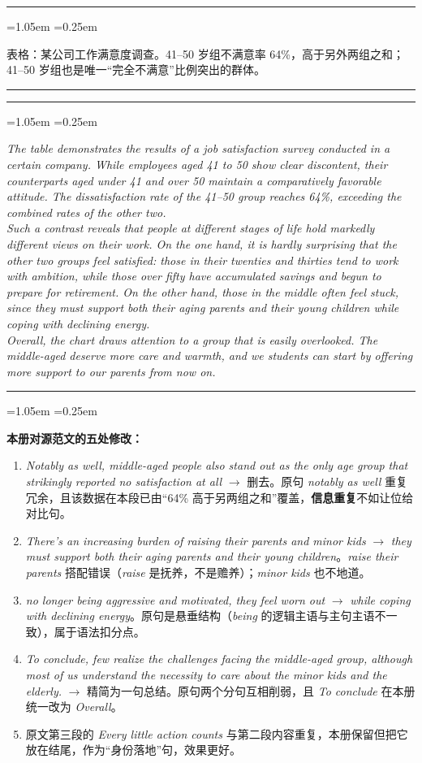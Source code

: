 \documentclass[11pt,a4paper]{ctexart}
\newcommand{\en}[1]{\textit{#1}}
\newenvironment{tpl}[1]{%
  \par\addvspace{7pt}\needspace{4\baselineskip}%
  \noindent{\bfseries\color{accent}#1}\par\nopagebreak
  \vspace{2pt}\noindent\rule{\linewidth}{0.7pt}\par\nopagebreak\vspace{3pt}%
  \begin{list}{}{\leftmargin=1.05em \rightmargin=0.25em \listparindent=0pt
    \itemindent=0pt \topsep=0pt \parsep=2.5pt \itemsep=2.5pt \partopsep=0pt}%
  \item\relax
}{%
  \end{list}\vspace{1pt}\noindent\rule{\linewidth}{0.7pt}\par\addvspace{8pt}%
}
\newenvironment{note}{%
  \par\addvspace{5pt}%
  \begin{list}{}{\leftmargin=1.05em \rightmargin=0.25em \listparindent=0pt
    \itemindent=0pt \topsep=0pt \parsep=2pt \itemsep=2pt \partopsep=0pt}%
  \item\relax\small\color{ink}%
}{%
  \end{list}\addvspace{5pt}%
}
\begin{document}
\begin{tpl}{题目要点}
表格：某公司工作满意度调查。41--50 岁组不满意率 64\%，高于另外两组之和；41--50 岁组也是唯一“完全不满意”比例突出的群体。
\end{tpl}

\begin{tpl}{批注版范文（158 词）}
\en{The table demonstrates the results of a job satisfaction survey conducted in a certain company. While employees aged 41 to 50 show clear discontent, their counterparts aged under 41 and over 50 maintain a comparatively favorable attitude. The dissatisfaction rate of the 41--50 group reaches 64\%, exceeding the combined rates of the other two.}\\[3pt]
\en{Such a contrast reveals that people at different stages of life hold markedly different views on their work. On the one hand, it is hardly surprising that the other two groups feel satisfied: those in their twenties and thirties tend to work with ambition, while those over fifty have accumulated savings and begun to prepare for retirement. On the other hand, those in the middle often feel stuck, since they must support both their aging parents and their young children while coping with declining energy.}\\[3pt]
\en{Overall, the chart draws attention to a group that is easily overlooked. The middle-aged deserve more care and warmth, and we students can start by offering more support to our parents from now on.}
\end{tpl}

\begin{note}
\textbf{本册对源范文的五处修改：}
\begin{enumerate}[leftmargin=1.7em,itemsep=1.5pt,topsep=2pt]
\item \en{Notably as well, middle-aged people also stand out as the only age group that strikingly reported no satisfaction at all} $\rightarrow$ 删去。原句 \en{notably as well} 重复冗余，且该数据在本段已由“64\% 高于另两组之和”覆盖，\textbf{信息重复}不如让位给对比句。
\item \en{There's an increasing burden of raising their parents and minor kids} $\rightarrow$ \en{they must support both their aging parents and their young children}。\en{raise their parents} 搭配错误（\en{raise} 是抚养，不是赡养）；\en{minor kids} 也不地道。
\item \en{no longer being aggressive and motivated, they feel worn out} $\rightarrow$ \en{while coping with declining energy}。原句是悬垂结构（\en{being} 的逻辑主语与主句主语不一致），属于语法扣分点。
\item \en{To conclude, few realize the challenges facing the middle-aged group, although most of us understand the necessity to care about the minor kids and the elderly.} $\rightarrow$ 精简为一句总结。原句两个分句互相削弱，且 \en{To conclude} 在本册统一改为 \en{Overall}。
\item 原文第三段的 \en{Every little action counts} 与第二段内容重复，本册保留但把它放在结尾，作为“身份落地”句，效果更好。
\end{enumerate}
\end{note}
\end{document}
